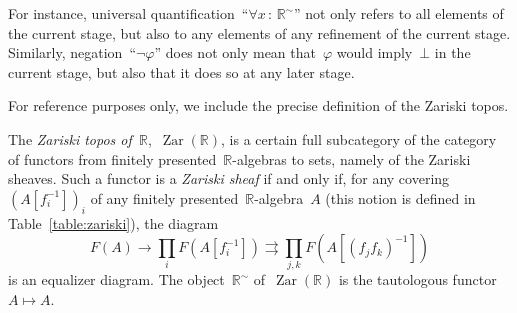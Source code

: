 \documentclass[graybox]{svmult}
\newcommand{\RR}{\mathbb{R}}
\DeclareMathOperator{\Zar}{Zar}
\renewcommand{\_}{\mathpunct{.}\,}
\newcommand{\?}{\,{:}\,}
\begin{document}
For instance, universal quantification~``$\forall x \? \RR^\sim$'' not only refers to
all elements of the current stage, but also to any elements of any refinement
of the current stage. Similarly, negation~``$\neg\varphi$'' does not only mean
that~$\varphi$ would imply~$\bot$ in the current stage, but also that it does
so at any later stage.

For reference purposes only, we include the precise definition of the Zariski topos.
\begin{definition}The \emph{Zariski topos of~$\RR$},~$\Zar(\RR)$, is a certain full subcategory of
the category of functors from finitely presented~$\RR$-algebras to sets, namely of
the Zariski sheaves. Such a functor is a \emph{Zariski sheaf} if and only if,
for any covering~$(A[f_i^{-1}])_i$ of any finitely presented~$\RR$-algebra~$A$
(this notion is defined in Table~\ref{table:zariski}), the diagram
\[ F(A) \rightarrow \prod_i F(A[f_i^{-1}]) \rightrightarrows \prod_{j,k}
F(A[(f_jf_k)^{-1}]) \]
is an equalizer diagram. The object~$\RR^\sim$ of~$\Zar(\RR)$ is the tautologous functor~$A \mapsto A$.
\end{definition}
\end{document}
